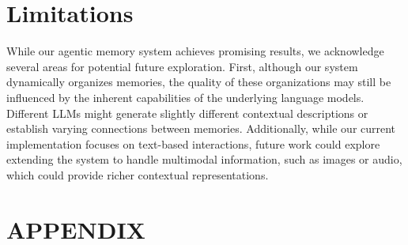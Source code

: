 \documentclass{article}
\begin{document}
\section{Limitations}
While our agentic memory system achieves promising results, we acknowledge several areas for potential future exploration. First, although our system dynamically organizes memories, the quality of these organizations may still be influenced by the inherent capabilities of the underlying language models. Different LLMs might generate slightly different contextual descriptions or establish varying connections between memories. Additionally, while our current implementation focuses on text-based interactions, future work could explore extending the system to handle multimodal information, such as images or audio, which could provide richer contextual representations. 

\clearpage




\clearpage
\onecolumn
\tableofcontents

\clearpage

\section*{APPENDIX}
\appendix
\end{document}

